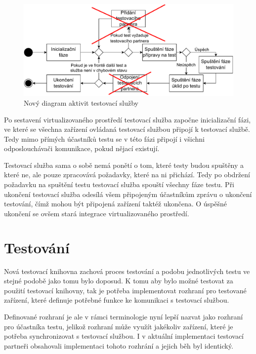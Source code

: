 \begin{figure}[htbp]
    \centering 
    \includegraphics[width=\textwidth]{assets/img/activitydiagramservicechange.pdf}
    \caption{Nový diagram aktivit testovací služby}
    \label{fig:activitydiagramservice}
\end{figure}

Po sestavení virtualizovaného prostředí testovací služba započne inicializační fázi, ve které se všechna zařízení ovládaná testovací službou připojí k testovací službě. Tedy mimo přímých účastníků testu se v této fázi připojí i všichni odposlouchávači komunikace, pokud nějací existují. 

Testovací služba sama o sobě nemá ponětí o tom, které testy budou spuštěny a které ne, ale pouze zpracovává požadavky, které na ni přichází. Tedy po obdržení požadavku na spuštění testu testovací služba spouští všechny fáze testu. Při ukončení testovací služba odesílá všem připojeným účastníkům zprávu o ukončení testování, čímž mohou být připojená zařízení taktéž ukončena. O úspěšné ukončení se ovšem stará integrace virtualizovaného prostředí.

\section{Testování}

Nová testovací knihovna zachová proces testování a podobu jednotlivých testu ve stejné podobě jako tomu bylo doposud. K tomu aby bylo možné testovat za použití testovací knihovny, tak je potřeba implementovat rozhraní pro testované zařízení, které definuje potřebné funkce ke komunikaci s testovací službou. 

Definované rozhraní je ale v rámci terminologie nyní lepší nazvat jako rozhraní pro účastníka testu, jelikož rozhraní může využít jakékoliv zařízení, které je potřeba synchronizovat s testovací službou. I v aktuální implementaci testovací partneři obsahovali implementaci tohoto rozhrání a jejich běh byl identický. 


